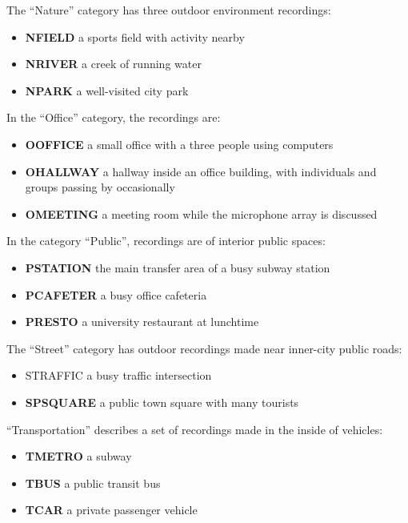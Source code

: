 \documentclass[../main.tex]{subfiles}
\begin{document}
The “Nature” category has three outdoor environment recordings:

\begin{itemize}
    \item \textbf{NFIELD} a sports field with activity nearby
    \item \textbf{NRIVER} a creek of running water
    \item \textbf{NPARK} a well-visited city park
\end{itemize}

In the “Office” category, the recordings are:

\begin{itemize}
    \item \textbf{OOFFICE} a small office with a three people using computers
    \item \textbf{OHALLWAY} a hallway inside an office building, with individuals and groups passing by
    occasionally
    \item \textbf{OMEETING} a meeting room while the microphone array is discussed
\end{itemize}

In the category “Public”, recordings are of interior public spaces:

\begin{itemize}
    \item \textbf{PSTATION} the main transfer area of a busy subway station
    \item \textbf{PCAFETER} a busy office cafeteria
    \item \textbf{PRESTO} a university restaurant at lunchtime
\end{itemize}

The “Street” category has outdoor recordings made near inner-city public roads:

\begin{itemize}
    \item {STRAFFIC} a busy traffic intersection
    \item \textbf{SPSQUARE} a public town square with many tourists
\end{itemize}

“Transportation” describes a set of recordings made in the inside of vehicles:

\begin{itemize}
    \item \textbf{TMETRO} a subway
    \item \textbf{TBUS} a public transit bus
    \item \textbf{TCAR} a private passenger vehicle
\end{itemize}
\end{document}
